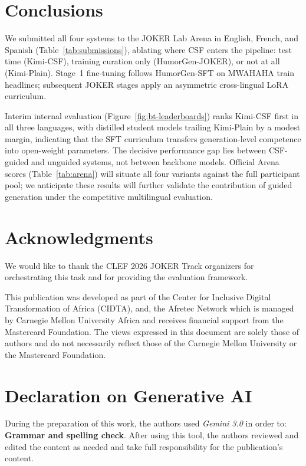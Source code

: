 \documentclass[]{ceurart}
\begin{document}
\section{Conclusions}
\label{sec:conclusions}

We submitted all four systems to the JOKER Lab Arena in English, French, and
Spanish (Table~\ref{tab:submissions}), ablating where CSF enters the pipeline:
test time (Kimi-CSF), training curation only (HumorGen-JOKER), or not at all
(Kimi-Plain).
Stage~1 fine-tuning follows HumorGen-SFT on MWAHAHA train headlines; subsequent
JOKER stages apply an asymmetric cross-lingual LoRA curriculum.

Interim internal evaluation (Figure~\ref{fig:bt-leaderboards}) ranks Kimi-CSF
first in all three languages, with distilled student models trailing Kimi-Plain
by a modest margin, indicating that the SFT curriculum transfers
generation-level competence into open-weight parameters.
The decisive performance gap lies between CSF-guided and unguided systems,
not between backbone models.
Official Arena scores (Table~\ref{tab:arena}) will situate all four variants
against the full participant pool; we anticipate these results will further
validate the contribution of guided generation under the competitive multilingual
evaluation.

\section*{Acknowledgments}
We would like to thank the CLEF 2026 JOKER Track organizers for orchestrating this task and for providing the evaluation framework.

This publication was developed as part of the Center for Inclusive Digital Transformation of Africa (CIDTA), and, the Afretec Network which is managed by Carnegie Mellon University Africa and receives financial support from the Mastercard Foundation. The views expressed in this document are solely those of authors and do not necessarily reflect those of the Carnegie Mellon University or the Mastercard Foundation.

\section*{Declaration on Generative AI}
During the preparation of this work, the authors used \emph{Gemini 3.0} in order to: \textbf{Grammar and spelling check}. After using this tool, the authors reviewed and edited the content as needed and take full responsibility for the publication's content.
\end{document}
